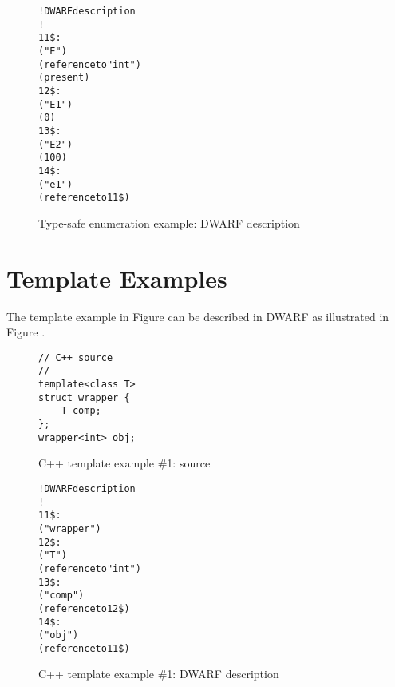 \begin{figure}[ht]
\begin{dwflisting}
\begin{alltt}
! DWARF description
!
11\$:  \DWTAGenumerationtype
          \DWATname("E")
          \DWATtype(reference to "int")
          \DWATenumclass(present)
12\$:      \DWTAGenumerator
              \DWATname("E1")
              \DWATconstvalue(0)
13\$:      \DWTAGenumerator
              \DWATname("E2")
              \DWATconstvalue(100)
14\$:  \DWTAGvariable
          \DWATname("e1")
          \DWATtype(reference to 11\$)
\end{alltt}
\end{dwflisting}
\caption{Type-safe enumeration example: DWARF description}
\label{fig:ctypesafeenumerationexampledwarf}
\end{figure}


\clearpage
\section{Template Examples}
\label{app:templateexample}

The  template example in
Figure 
can be described in DWARF as illustrated in 
Figure .

\begin{figure}[ht]
\begin{lstlisting}
// C++ source
//
template<class T>
struct wrapper {
    T comp;
};
wrapper<int> obj;
\end{lstlisting}
\caption{C++ template example \#1: source}
\label{fig:ctemplateexample1source}
\end{figure}

\begin{figure}[ht]
\begin{dwflisting}
\begin{alltt}
! DWARF description
!
11\$:  \DWTAGstructuretype
          \DWATname("wrapper")
12\$:      \DWTAGtemplatetypeparameter
              \DWATname("T")
              \DWATtype(reference to "int")
13\$:      \DWTAGmember
              \DWATname("comp")
              \DWATtype(reference to 12\$)
14\$:  \DWTAGvariable
          \DWATname("obj")
          \DWATtype(reference to 11\$)
\end{alltt}
\end{dwflisting}
\caption{C++ template example \#1: DWARF description}
\label{fig:ctemplateexample1dwarf}
\end{figure}

